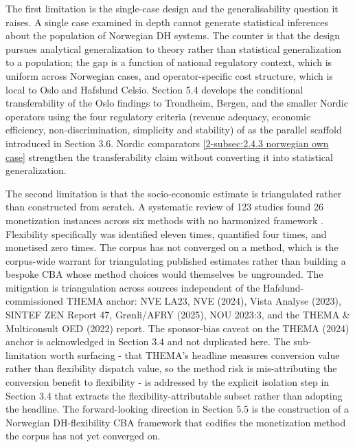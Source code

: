 The first limitation is the single-case design and the generalisability question it raises. A single case examined in depth cannot generate statistical inferences about the population of Norwegian DH systems. The counter is that the design pursues analytical generalization to theory rather than statistical generalization to a population; the gap is a function of national regulatory context, which is uniform across Norwegian cases, and operator-specific cost structure, which is local to Oslo and Hafslund Celsio. Section 5.4 develops the conditional transferability of the Oslo findings to Trondheim, Bergen, and the smaller Nordic operators using the four regulatory criteria (revenue adequacy, economic efficiency, non-discrimination, simplicity and stability) of \cite{bergaentzle_electricity_2019} as the parallel scaffold introduced in Section 3.6. Nordic comparators \autoref{2-subsec:2.4.3 norwegian own case} strengthen the transferability claim without converting it into statistical generalization.

The second limitation is that the socio-economic estimate is triangulated rather than constructed from scratch. A systematic review of 123 studies found 26 monetization instances across six methods with no harmonized framework \cite{ahmed_district_2025}. Flexibility specifically was identified eleven times, quantified four times, and monetised zero times. The corpus has not converged on a method, which is the corpus-wide warrant for triangulating published estimates rather than building a bespoke CBA whose method choices would themselves be ungrounded. The mitigation is triangulation across sources independent of the Hafslund-commissioned THEMA anchor: NVE LA23, NVE (2024), Vista Analyse (2023), SINTEF ZEN Report 47, Grønli/AFRY (2025), NOU 2023:3, and the THEMA \& Multiconsult OED (2022) report. The sponsor-bias caveat on the THEMA (2024) anchor is acknowledged in Section 3.4 and not duplicated here. The sub-limitation worth surfacing - that THEMA's headline measures conversion value rather than flexibility dispatch value, so the method risk is mis-attributing the conversion benefit to flexibility - is addressed by the explicit isolation step in Section 3.4 that extracts the flexibility-attributable subset rather than adopting the headline. The forward-looking direction in Section 5.5 is the construction of a Norwegian DH-flexibility CBA framework that codifies the monetization method the corpus has not yet converged on.

